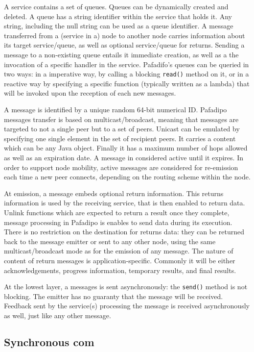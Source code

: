 \documentclass{article}
\begin{document}
A service contains a set of queues. Queues can be dynamically created and deleted. A queue has a string identifier within the service that holds it. Any string, including the null string can be used as a queue identifier. A message transferred from a (service in a) node to another node carries information about its target service/queue, as well as optional service/queue for returns. Sending a message to a non-existing queue entails it immediate creation, as well as a the invocation of a specific handler in the service. 
 Pafadifo's queues can be queried in two ways: in a imperative way, by calling a blocking \texttt{read()} method on it, or in a reactive way by specifying a specific function (typically written as a lambda) that will be invoked upon the reception of each new messages.
 

A message is identified by a unique random 64-bit numerical ID.
Pafadipo messages transfer is based on multicast/broadcast, meaning that  messages are targeted to not a single peer but to a set of peers. Unicast can be emulated by specifying one single element in the set of recipient peers.  It carries a content which can be any Java object. Finally it has a maximum number of hops allowed as well as an expiration date. A message in considered active until it expires. In order to support node mobility, active messages are considered for re-emission each time a new peer connects, depending on the routing scheme within the node.

At emission, a message embeds optional return information. This returns information is used by the receiving service, that is then enabled to return data. Unlink functions which are expected to return a result once they complete, message processing in Pafadipo is enables to send data during its execution. There is no restriction on the destination for returns data: they can be returned back to the message emitter or sent to any other node, using the same multicast/broadcast mode as for the emission of any message.  The nature of content of return messages is application-specific. Commonly it will be either acknowledgements, progress information, temporary results, and final results.

At the lowest layer, a messages is sent asynchronously: the \texttt{send()} method is not blocking. The emitter has no guaranty that the message will be received. Feedback sent by the service(s) processing the message is received asynchronously as well, just like any other message.

\subsection{Synchronous com}
\end{document}
